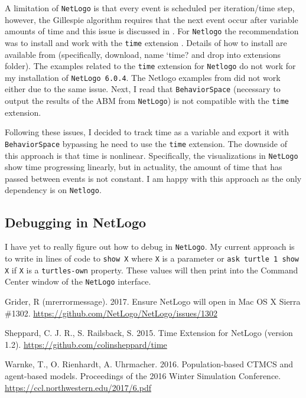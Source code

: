 \documentclass[11pt, oneside]{article}   	%
\begin{document}
A limitation of \texttt{NetLogo} is that every event is scheduled per iteration/time step, however, the Gillespie algorithm requires that the next event occur after variable amounts of time and this issue is discussed in \citealt{Warnke}. For \texttt{Netlogo} the recommendation was to install and work with the \texttt{time} extension \citep{time}. Details of how to install are available from \cite{time} (specifically, download, name `time? and drop into extensions folder). The examples related to the \texttt{time} extension for \texttt{Netlogo} do not work for my installation of \texttt{NetLogo 6.0.4}. The Netlogo examples from \cite{Warnke} did not work either due to the same issue. Next, I read that \texttt{BehaviorSpace} (necessary to output the results of the ABM from \texttt{NetLogo}) is not compatible with the \texttt{time} extension.

Following these issues, I decided to track time as a variable and export it with \texttt{BehaviorSpace} bypassing he need to use the \texttt{time} extension. The downside of this approach is that time is nonlinear. Specifically, the visualizations in \texttt{NetLogo} show time progressing linearly, but in actuality, the amount of time that has passed between events is not constant. I am happy with this approach as the only dependency is on \texttt{Netlogo}.

\subsection{Debugging in NetLogo}
I have yet to really figure out how to debug in \texttt{NetLogo}. My current approach is to write in lines of code to \texttt{show X} where \texttt{X} is a parameter or \texttt{ask turtle 1 show X} if \texttt{X} is a \texttt{turtles-own} property. These values will then print into the Command Center window of the \texttt{NetLogo} interface.

\begin{thebibliography}{10}
 Grider, R (mrerrormessage). 2017. Ensure NetLogo will open in Mac OS X Sierra \#1302. \url{https://github.com/NetLogo/NetLogo/issues/1302}

 Sheppard, C. J. R., S. Railsback, S. 2015. Time Extension for NetLogo (version 1.2). \url{https://github.com/colinsheppard/time}

  Warnke, T., O. Rienhardt, A. Uhrmacher. 2016. Population-based CTMCS and agent-based models. Proceedings of the 2016 Winter Simulation Conference. \url{https://ccl.northwestern.edu/2017/6.pdf}
 
\end{thebibliography}
\end{document}
